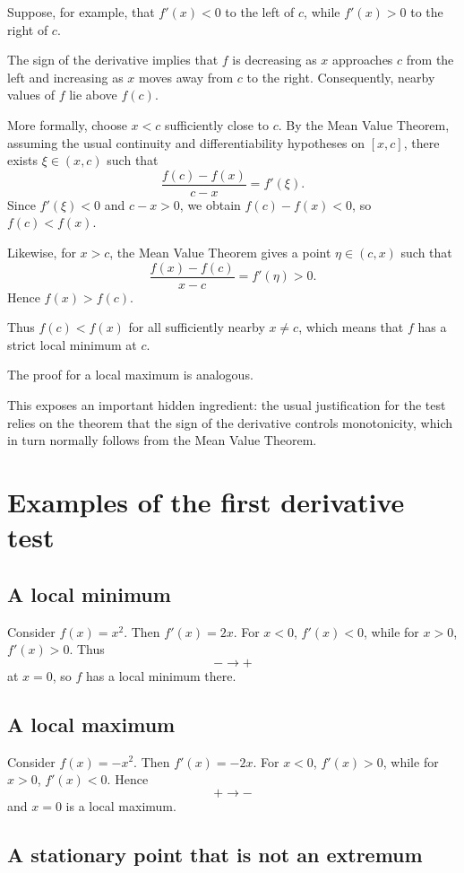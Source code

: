 \documentclass{essay}
\begin{document}
Suppose, for example, that \(f'(x)<0\) to the left of \(c\), while \(f'(x)>0\) to the right of \(c\).

The sign of the derivative implies that \(f\) is decreasing as \(x\) approaches \(c\) from the left and increasing as \(x\) moves away from \(c\) to the right. Consequently, nearby values of \(f\) lie above \(f(c)\).

More formally, choose \(x<c\) sufficiently close to \(c\). By the Mean Value Theorem, assuming the usual continuity and differentiability hypotheses on \([x,c]\), there exists \(\xi\in(x,c)\) such that
\[
\frac{f(c)-f(x)}{c-x}=f'(\xi).
\]
Since \(f'(\xi)<0\) and \(c-x>0\), we obtain \(f(c)-f(x)<0\), so \(f(c)<f(x)\).

Likewise, for \(x>c\), the Mean Value Theorem gives a point \(\eta\in(c,x)\) such that
\[
\frac{f(x)-f(c)}{x-c}=f'(\eta)>0.
\]
Hence \(f(x)>f(c)\).

Thus \(f(c)<f(x)\) for all sufficiently nearby \(x\neq c\), which means that \(f\) has a strict local minimum at \(c\).

The proof for a local maximum is analogous.

This exposes an important hidden ingredient: the usual justification for the test relies on the theorem that the sign of the derivative controls monotonicity, which in turn normally follows from the Mean Value Theorem.

\section{Examples of the first derivative test}

\subsection{A local minimum}

Consider \(f(x)=x^2\). Then \(f'(x)=2x\). For \(x<0\), \(f'(x)<0\), while for \(x>0\), \(f'(x)>0\).
Thus
\[
-\longrightarrow +
\]
at \(x=0\), so \(f\) has a local minimum there.

\subsection{A local maximum}

Consider \(f(x)=-x^2\). Then \(f'(x)=-2x\).
For \(x<0\), \(f'(x)>0\), while for \(x>0\), \(f'(x)<0\). Hence
\[
+\longrightarrow -
\]
and \(x=0\) is a local maximum.

\subsection{A stationary point that is not an extremum}
\end{document}
